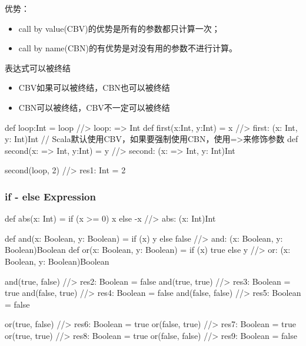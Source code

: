 优势：
\begin{itemize}
\item call by value(CBV)的优势是所有的参数都只计算一次；
\item call by name(CBN)的有优势是对没有用的参数不进行计算。
\end{itemize}

表达式可以被终结
\begin{itemize}
\item CBV如果可以被终结，CBN也可以被终结
\item CBN可以被终结，CBV不一定可以被终结
\end{itemize}

\begin{Scala}
  def loop:Int = loop                             //> loop: => Int
  def first(x:Int, y:Int) = x                     //> first: (x: Int, y: Int)Int
  // Scala默认使用CBV，如果要强制使用CBN，使用=>来修饰参数
  def second(x: => Int, y:Int) = y                //> second: (x: => Int, y: Int)Int
 
  second(loop, 2)                                 //> res1: Int = 2
\end{Scala}

\subsubsection{if - else Expression}

\begin{Scala}
  def abs(x: Int) = if (x >= 0) x else -x         //> abs: (x: Int)Int
\end{Scala}

\begin{Scala}[使用if实现and和or]
  def and(x: Boolean, y: Boolean) = if (x) y else false
                                                  //> and: (x: Boolean, y: Boolean)Boolean
  def or(x: Boolean, y: Boolean) = if (x) true else y
                                                  //> or: (x: Boolean, y: Boolean)Boolean

  and(true, false)                                //> res2: Boolean = false
  and(true, true)                                 //> res3: Boolean = true
  and(false, true)                                //> res4: Boolean = false
  and(false, false)                               //> res5: Boolean = false

  or(true, false)                                 //> res6: Boolean = true
  or(false, true)                                 //> res7: Boolean = true
  or(true, true)                                  //> res8: Boolean = true
  or(false, false)                                //> res9: Boolean = false
\end{Scala}

